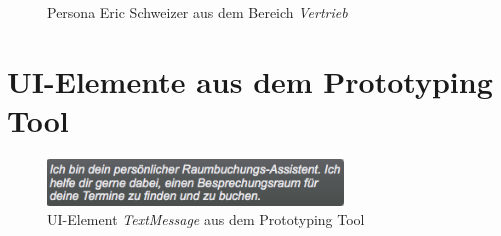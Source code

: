 \begin{figure}[!htb]
    \centering
    \caption{Persona Eric Schweizer aus dem Bereich \textit{Vertrieb}}
    \label{fig:persona-vertrieb}
\end{figure}

\clearpage

\section{\acs{UI}-Elemente aus dem Prototyping Tool}
\label{sec:anhang-ui-elemente-prototyping}

\begin{figure}[!htb]
    \centering
    \vspace{1.5cm}
    \includegraphics[width=0.7\textwidth]{bilder/anhang/UIElementsPrototyping/TextMessage.png}
    \caption{\acs{UI}-Element \textit{TextMessage} aus dem Prototyping Tool}
    \label{fig:ui-element-textmessage}
\end{figure}

